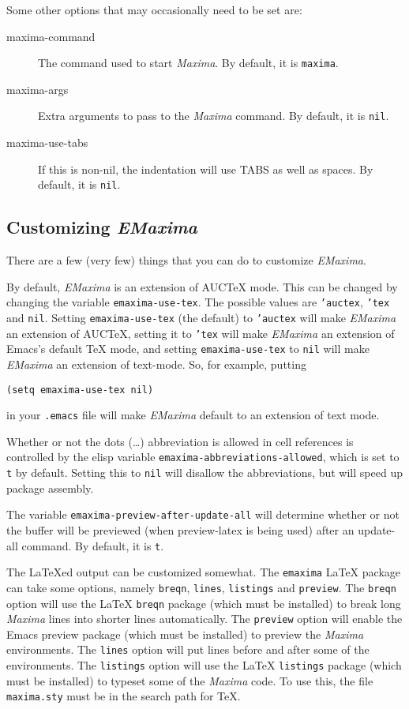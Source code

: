 \documentclass{article}
\newcommand{\emx}{\textsl{\sffamily EMaxima}}
\newcommand{\mx}{\textsl{\sffamily Maxima}}
\newcommand{\hyph}{-\hspace{0pt}}
\begin{document}
Some other options that may occasionally need to be set are:
\begin{description}
\item[maxima-command]  The command used to start \mx{}.  By default,
  it is \texttt{maxima}.
\item[maxima-args] Extra arguments to pass to the \mx{} command.  By
  default, it is \texttt{nil}.
\item[maxima-use-tabs]  If this is non-nil, the indentation will use
  TABS as well as spaces.  By default, it is \texttt{nil}.
\end{description}


\subsection{Customizing \emx{}}
\label{app:custemx}

There are a few (very few) things that you can do to customize \emx{}.  

By default, \emx{} is an extension of AUC\TeX{} mode.  This can be
changed by changing the variable \texttt{emaxima\hyph{}use\hyph{}tex}.  The possible
values are \texttt{'auctex}, \texttt{'tex} and \texttt{nil}.  Setting
\texttt{emaxima\hyph{}use\hyph{}tex} (the default) to \texttt{'auctex} will make \emx{}
an extension of AUC\TeX{}, setting it to \texttt{'tex} will make \emx{} an
extension of Emacs's default \TeX{} mode, and setting
\texttt{emaxima\hyph{}use\hyph{}tex} to \texttt{nil} will make \emx{} an extension of
text-mode.  So, for example, putting 
\begin{verbatim}
(setq emaxima-use-tex nil)
\end{verbatim}
\noindent
in your \texttt{.emacs} file will make \emx{} default to an extension of
text mode. 

Whether or not the dots (\dots{}) abbreviation is allowed in cell
references is controlled by the elisp variable
\texttt{emaxima\hyph{}abbreviations\hyph{}allowed}, which is set to \texttt{t} by
default.  Setting this to \texttt{nil} will disallow the abbreviations,
but will speed up package assembly.

The variable \texttt{emaxima\hyph{}preview\hyph{}after\hyph{}update\hyph{}all} will determine
whether or not the buffer will be previewed (when preview-latex is
being used) after an update-all command.  By default, it is \texttt{t}.


The \LaTeX{}ed output can be customized somewhat.  The
\texttt{emaxima} LaTeX{} package can take some options, namely 
\texttt{breqn}, \texttt{lines}, \texttt{listings} and \texttt{preview}.
The \texttt{breqn} option will use the \LaTeX{} \texttt{breqn} package
(which must be installed) to break long \mx{} lines into shorter lines
automatically.
The \texttt{preview} option will enable the Emacs preview package
(which must be installed) to preview the \mx{} environments. 
The \texttt{lines} option will put lines before and after some of the
environments. 
The \texttt{listings} option will use the \LaTeX{} \texttt{listings}
package (which must be installed) to typeset some of the \mx{} code.
To use this, the file \texttt{maxima.sty} must be in the search path
for \TeX. 
\end{document}
